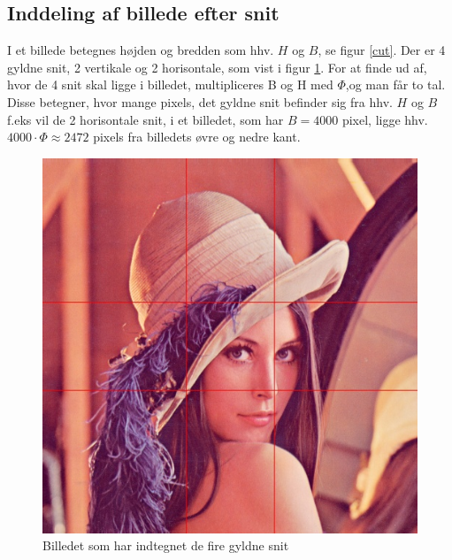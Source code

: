 \subsection{Inddeling af billede efter snit}

I et billede betegnes højden og bredden som hhv. $H$ og $B$, se figur
\ref{cut}. Der er 4 gyldne snit, 2 vertikale og 2 horisontale, som vist
i figur \ref{lenasnit2}. For at finde ud af, hvor de 4 snit skal ligge i
billedet, multipliceres B og H med $\varPhi$,og man får to tal. Disse
betegner, hvor mange pixels, det gyldne snit befinder sig fra hhv. $H$
og $B$ f.eks vil de 2 horisontale snit, i et billedet, som har $B =
4000$ pixel, ligge hhv. $4000 \cdot \varPhi \approx 2472$ pixels fra
billedets øvre og nedre kant.

\begin{figure}[h]
	\begin{center}
		\includegraphics[scale=0.42,angle=0]{afsnit/vores_implementation/billeder/naiv_algoritme/Lenagolden}
	\end{center}
	\caption[]{Billedet som har indtegnet de fire gyldne snit}
	\label{lenasnit2}
\end{figure}

